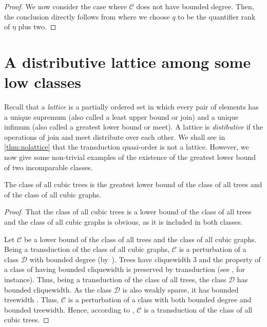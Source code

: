 \documentclass{lmcs}
\newcommand{\Cc}{\mathscr{C}}
\newcommand{\Dd}{\mathscr{D}}
\theoremstyle{definition}
\begin{document}
\begin{proof}
We now consider the case where $\Cc$ does not have bounded degree. Then, the conclusion directly follows from   where we choose $q$ to be the quantifier rank of $\eta$ plus two.
\end{proof}
\section{A distributive lattice among some low classes}

Recall that a \emph{lattice} is a partially ordered set in which every pair of elements has a unique supremum (also called a least upper bound or join) and a unique infimum (also called a greatest lower bound or meet). 
A lattice is \emph{distibutive} if the operations of join and meet distribute over each other. 
We shall see in \cref{thm:nolattice} that the transduction quasi-order is not a lattice. However, we now give some non-trivial examples of the existence of the greatest lower bound of two incomparable classes.

\begin{exa}
	\label{ex:BT}
	The class of all cubic trees is the greatest lower bound of the class of all trees and of the class of all cubic graphs.
\end{exa}
\begin{proof}
	That the class of all cubic trees is a lower bound of the class of all trees and the class of all cubic graphs is obvious, as it is included in both classes.
	
	Let  $\Cc$ be a lower bound of the class of all trees and the class of all cubic graphs. 
	Being a transduction of the class of all cubic graphs, $\Cc$ is a perturbation of a class $\Dd$ with bounded degree (by~). Trees have cliquewidth $3$ and the property of a class of having bounded cliquewidth is preserved by transduction (see \cite{colcombet2007combinatorial}, for instance). Thus, 
	being a transduction of the class of all trees,  the class $\Dd$ has bounded cliquewidth. As the class $\Dd$ is also weakly sparse, it has bounded treewidth  \cite{Gurski2000}. 
	Thus, $\Cc$ is a perturbation of a class with both bounded degree and bounded treewidth. Hence, according to , $\Cc$ is a transduction of the class of all cubic trees.
\end{proof}
\end{document}
